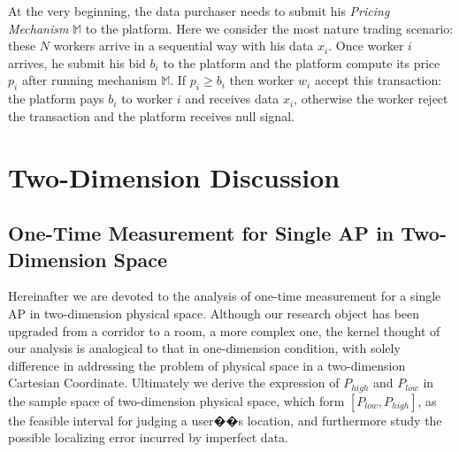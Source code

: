 \documentclass[journal]{IEEEtran}
\begin{document}
At the very beginning, the data purchaser needs to submit his \emph{Pricing Mechanism} $\mathbb{M}$ to the platform. Here we consider the most nature trading scenario: these $N$ workers arrive in a sequential way with his data $x_i$. Once worker $i$ arrives, he submit his bid $b_i$ to the platform and the platform compute its price $p_i$ after running mechanism $\mathbb{M}$. If $p_i\geq b_i$ then worker $w_i$ accept this transaction: the platform pays $b_i$ to worker $i$ and receives data $x_i$, otherwise the worker reject the transaction and the platform receives null signal.

\begin{table}[h]
\caption{\textsc{Notations}} \label{tab:Notation}
\centering
{}
\end{table}

\section{Two-Dimension Discussion}
\subsection{One-Time Measurement for Single AP in Two-Dimension Space}
Hereinafter we are devoted to the analysis of one-time measurement for a single AP in two-dimension physical space. Although our research object has been upgraded from a corridor to a room, a more complex one, the kernel thought of our analysis is analogical to that in one-dimension condition, with solely difference in addressing the problem of physical space in a two-dimension Cartesian Coordinate. Ultimately we derive the expression of $P_{high}$ and $P_{low}$ in the sample space of two-dimension physical space, which form $[{P_{low}},{P_{high}}]$, as the feasible interval for judging a user��s location, and furthermore study the possible localizing error incurred by imperfect data.
\end{document}
